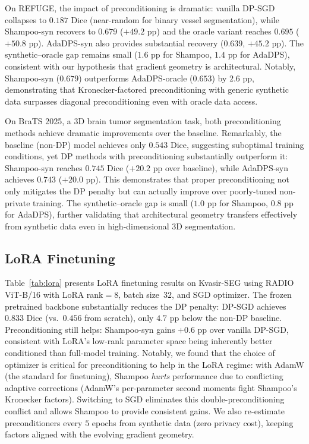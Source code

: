 \documentclass[runningheads]{llncs}
\begin{document}
On REFUGE, the impact of preconditioning is dramatic: vanilla DP-SGD collapses to $0.187$ Dice (near-random for binary vessel segmentation), while Shampoo-syn recovers to $0.679$ ($+49.2$ pp) and the oracle variant reaches $0.695$ ($+50.8$ pp). AdaDPS-syn also provides substantial recovery ($0.639$, $+45.2$ pp). The synthetic--oracle gap remains small ($1.6$ pp for Shampoo, $1.4$ pp for AdaDPS), consistent with our hypothesis that gradient geometry is architectural. Notably, Shampoo-syn ($0.679$) outperforms AdaDPS-oracle ($0.653$) by $2.6$ pp, demonstrating that Kronecker-factored preconditioning with generic synthetic data surpasses diagonal preconditioning even with oracle data access.

On BraTS 2025, a 3D brain tumor segmentation task, both preconditioning methods achieve dramatic improvements over the baseline. Remarkably, the baseline (non-DP) model achieves only $0.543$ Dice, suggesting suboptimal training conditions, yet DP methods with preconditioning substantially outperform it: Shampoo-syn reaches $0.745$ Dice ($+20.2$ pp over baseline), while AdaDPS-syn achieves $0.743$ ($+20.0$ pp). This demonstrates that proper preconditioning not only mitigates the DP penalty but can actually improve over poorly-tuned non-private training. The synthetic--oracle gap is small ($1.0$ pp for Shampoo, $0.8$ pp for AdaDPS), further validating that architectural geometry transfers effectively from synthetic data even in high-dimensional 3D segmentation.

\subsection{LoRA Finetuning}
\label{subsec:lora}

Table~\ref{tab:lora} presents LoRA finetuning results on Kvasir-SEG using RADIO ViT-B/16 with LoRA rank$=8$, batch size~$32$, and SGD optimizer. The frozen pretrained backbone substantially reduces the DP penalty: DP-SGD achieves $0.833$ Dice (vs.\ $0.456$ from scratch), only $4.7$ pp below the non-DP baseline. Preconditioning still helps: Shampoo-syn gains $+0.6$ pp over vanilla DP-SGD, consistent with LoRA's low-rank parameter space being inherently better conditioned than full-model training. Notably, we found that the choice of optimizer is critical for preconditioning to help in the LoRA regime: with AdamW (the standard for finetuning), Shampoo \emph{hurts} performance due to conflicting adaptive corrections (AdamW's per-parameter second moments fight Shampoo's Kronecker factors). Switching to SGD eliminates this double-preconditioning conflict and allows Shampoo to provide consistent gains. We also re-estimate preconditioners every $5$ epochs from synthetic data (zero privacy cost), keeping factors aligned with the evolving gradient geometry.
\end{document}
